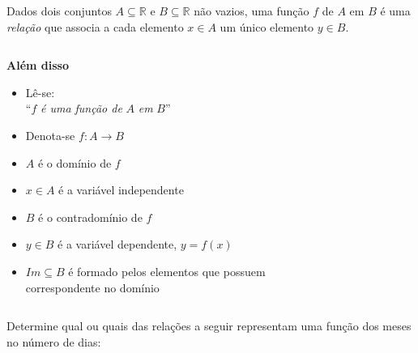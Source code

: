 \begin{frame}
  \begin{definition}
    Dados dois conjuntos $A\subseteq\mathbb{R}$ e $B\subseteq\mathbb{R}$ não vazios, uma função $f$ de $A$ em $B$ é uma \emph{relação} que associa a cada elemento $x\in A$ um único elemento $y\in B$.
  \end{definition}

  \begin{columns}[onlytextwidth]
    \begin{column}{0.5\textwidth}
      \textbf{Além disso}
      \begin{itemize}
        \item Lê-se: \\ ``$f$ \emph{é uma função de} $A$ \emph{em} $B$''
        \item Denota-se $f:A\rightarrow B$
        \item $A$ é o domínio de $f$
        \item $x\in A$ é a variável independente
        \item $B$ é o contradomínio de $f$
        \item $y\in B$ é a variável dependente, $y=f(x)$
        \item $Im\subseteq B$ é formado pelos elementos que possuem correspondente no domínio
      \end{itemize}
    \end{column}

    \begin{column}{0.5\textwidth}
      \begin{figure}
      \end{figure}
    \end{column}
  \end{columns}
\end{frame}

\begin{frame}
  \begin{example}
    Determine qual ou quais das relações a seguir representam uma função dos meses no número de dias:
  \end{example}
  \vspace*{1cm}
  \begin{figure}
  \end{figure}
\end{frame}

